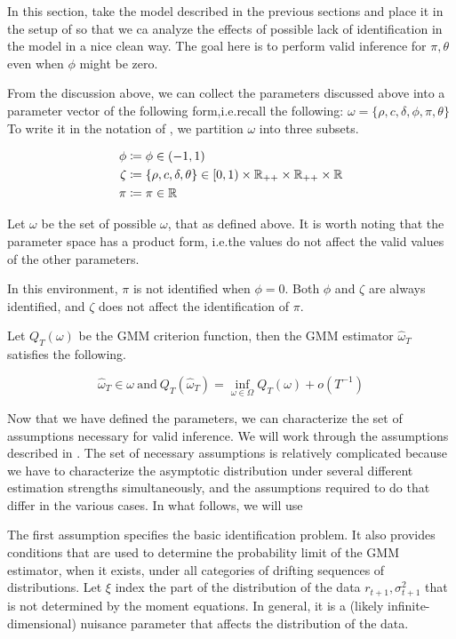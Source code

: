\documentclass[11pt, letterpaper, twoside, final]{article}
\begin{document}
In this section, take the model described in the previous sections and place it in the setup of
\textcite{andrews2014Gmm} so that we ca analyze the effects of possible lack of identification in the model in a
nice clean way.
The goal here is to perform valid inference for $\pi, \theta$ even when $\phi$ might be zero. 


From the discussion above, we can collect the parameters discussed above into a parameter vector of the following
form,i.e.\@ recall the following: $\omega = \lbrace \rho, c, \delta, \phi, \pi, \theta \rbrace$
To write it in the notation of \textcite{andrews2014Gmm}, we partition $\omega$ into three subsets.

\begin{align}
    \phi &\coloneqq \phi  \in (-1, 1) \\ 
    \zeta &\coloneqq \lbrace \rho, c, \delta, \theta \rbrace \in [0,1) \times \mathbb{R}_{++} \times \mathbb{R}_{++} \times
    \mathbb{R}  \\
    \pi &\coloneqq \pi \in \mathbb{R}
\end{align}

Let $\omega$ be the set of possible $\omega$, that as defined above.
It is worth noting that the parameter space has a product form, i.e.\@ the values do not affect the valid values
of the other parameters.

In this environment, $\pi$ is not identified when $\phi = 0$.
Both $\phi$ and $\zeta$ are always identified, and $\zeta$ does not affect the identification of $\pi$.

Let $Q_T(\omega)$ be the GMM criterion function, then the GMM estimator $\hat{\omega}_T$ satisfies the following.


\begin{equation}
    \widehat{\omega}_T \in \omega\ \text{and}\ Q_T(\hat{\omega}_T) = \inf_{\omega \in \Omega} Q_T(\omega) +
    o\left(T^{-1}\right) 
\end{equation}


Now that we have defined the parameters, we can characterize the set of assumptions necessary for valid inference.
We will work through the assumptions described in \textcite{andrews2014Gmm}.
The set of necessary assumptions is relatively complicated because we have to characterize the asymptotic
distribution under several different estimation strengths simultaneously, and the assumptions required to do that
  differ in the various cases. 
In what follows, we will use 

The first assumption specifies the basic identification
problem. It also provides conditions that are used to determine the
probability limit of the GMM estimator, when it exists, under all categories
of drifting sequences of distributions.
Let $\xi$ index the part of the distribution of the data $r_{t+1}, \sigma^2_{t+1}$ that is not determined by the
moment equations.
In general, it is a (likely infinite-dimensional) nuisance parameter that affects the distribution of the data. 
\end{document}
